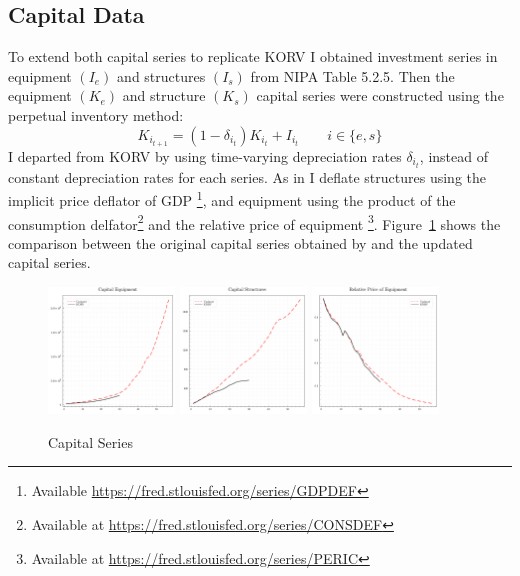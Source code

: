 \documentclass[12pt]{article}
\begin{document}
\subsection{Capital Data}\label{sec:capital_data}
To extend both capital series to replicate KORV I obtained investment series in equipment $(I_e)$ and structures $(I_s)$ from NIPA Table 5.2.5. Then the equipment $(K_e)$ and structure $(K_s)$ capital series were constructed using the perpetual inventory method:
\begin{equation}\label{eq:capital_law_motion}
 K_{i_{t+1}} = (1 - \delta_{i_t}) K_{i_{t}} + I_{i_{t}} \qquad i\in\{e, s\}
\end{equation}
\noindent
I departed from KORV by using time-varying depreciation rates $\delta_{i_t}$, instead of constant depreciation rates for each series. As in \citep{ohanian2021revisiting} I deflate structures using the implicit price deflator of GDP \footnote{Available \url{https://fred.stlouisfed.org/series/GDPDEF}}, and equipment using the product of the consumption delfator\footnote{Available at \url{https://fred.stlouisfed.org/series/CONSDEF}} and the relative price of equipment \footnote{Available at \url{https://fred.stlouisfed.org/series/PERIC}}. Figure~\ref*{fig:capital_series} shows the comparison between the original capital series obtained by \citep{krusell2000capital} and the updated capital series. 

\begin{figure}[H]
\centering
\includegraphics[width=0.3\textwidth]{../images/capital_equipment_doc.pdf}
\hfill
\includegraphics[width=0.3\textwidth]{../images/capital_structures_doc.pdf}
\hfill
\includegraphics[width=0.3\textwidth]{../images/capital_price_doc.pdf}
\caption{\label{fig:capital_series} Capital Series}
\end{figure}
\end{document}

